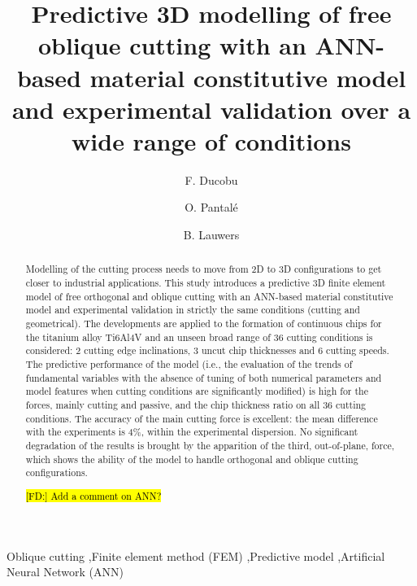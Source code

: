 \documentclass[preprint,12pt,times]{elsarticle}
\DeclareRobustCommand{\FD}[1]{ {\begingroup\sethlcolor{VWgreen}\textcolor{black}{\hl{[FD:] #1}}\endgroup} }
\begin{document}
\begin{frontmatter}

\title{Predictive 3D modelling of free oblique cutting with an ANN-based material constitutive model and experimental validation over a wide range of conditions}

\author[1]{F. Ducobu}

\author[2]{O. Pantal\'{e}}
\author[3]{B. Lauwers}

\address[1]{Machine Design and Production Engineering Lab, Research Institute for Science and Material Engineering, UMONS, Belgium}
\address[2]{Laboratoire G\'{e}nie de Production, INP/ENIT, Universit\'{e} de Toulouse, Tarbes, France}
\address[3]{Department of Mechanical Engineering, KU Leuven \& Flanders Make@KU Leuven-MaPS, Belgium}

\begin{abstract}

Modelling of the cutting process needs to move from 2D to 3D configurations to get closer to industrial applications. This study introduces a predictive 3D finite element model of free orthogonal and oblique cutting with an ANN-based material constitutive model and experimental validation in strictly the same conditions (cutting and geometrical). The developments are applied to the formation of continuous chips for the titanium alloy Ti6Al4V and an unseen broad range of 36 cutting conditions is considered: 2 cutting edge inclinations, 3 uncut chip thicknesses and 6 cutting speeds. The predictive performance of the model (i.e., the evaluation of the trends of fundamental variables with the absence of tuning of both numerical parameters and model features when cutting conditions are significantly modified) is high for the forces, mainly cutting and passive, and the chip thickness ratio on all 36 cutting conditions. The accuracy of the main cutting force is excellent: the mean difference with the experiments is 4\%, within the experimental dispersion. No significant degradation of the results is brought by the apparition of the third, out-of-plane, force, which shows the ability of the model to handle orthogonal and oblique cutting configurations.

\FD{Add a comment on ANN?}

\end{abstract}

\begin{keyword}

Oblique cutting \sep Finite element method (FEM) \sep Predictive model \sep Artificial Neural Network (ANN)

\end{keyword}

\end{frontmatter}
\end{document}
